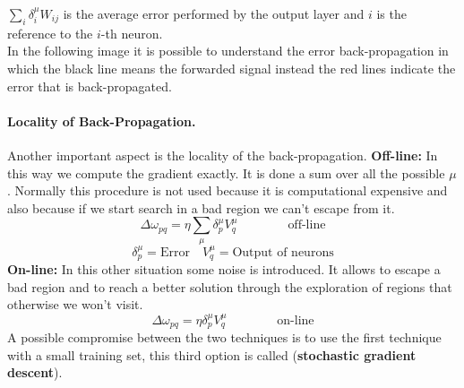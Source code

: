 $\sum_{i} \delta_{i}^{\mu} W_{ij}$ is the average error performed by the output layer and $i$ is the reference to the $i$-th neuron.\\
In the following image it is possible to understand the error back-propagation in which the black line means the forwarded signal instead the red lines indicate the error that is back-propagated.

\paragraph*{Locality of Back-Propagation.} Another important aspect is the locality of the back-propagation.
\textbf{Off-line:} In this way we compute the gradient exactly. It is done a sum over all the possible $\mu$. Normally this procedure is not used because it is computational expensive and also because if we start search in a bad region we can't escape from it.
$$\Delta \omega_{pq} = \eta \sum_{\mu} \delta_{p}^{\mu} V_{q}^{\mu} \qquad \qquad \text{off-line}$$
$$\delta_{p}^{\mu} = \text{Error} \quad V_{q}^{\mu} = \text{Output of neurons}$$
\textbf{On-line:} In this other situation some noise is introduced. It allows to escape a bad region and to reach a better solution through the exploration of regions that otherwise we won't visit.
$$\Delta \omega_{pq} = \eta\delta_ {p}^{\mu} V_{q}^{\mu} \qquad \qquad \text{on-line}$$
A possible compromise between the two techniques is to use the first technique with a small training set, this third option is called (\textbf{stochastic gradient descent}).

